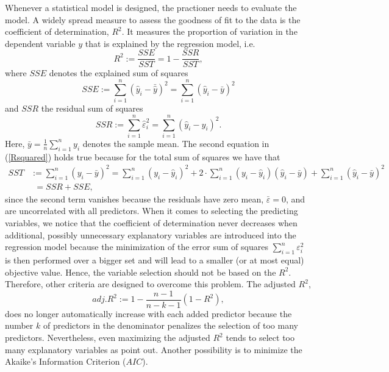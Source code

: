 \documentclass[a4paper, 11pt]{scrreprt}
\begin{document}
Whenever a statistical model is designed, the practioner needs to evaluate the model. A widely spread measure to assess the goodness of fit to the data is the coefficient of determination, $R^2$. It measures the proportion of variation in the dependent variable $y$ that is explained by the regression model, i.e.
\begin{equation}\label{Rsquared}
R^2 := \frac{SSE}{SST} = 1 - \frac{SSR}{SST},
\end{equation}
where $SSE$ denotes the explained sum of squares
\begin{equation}\label{SSE}
SSE := \sum_{i=1}^n (\hat{y}_i - \bar{\hat{y}})^2 = \sum_{i=1}^n (\hat{y}_i - \bar{y})^2
\end{equation}
and $SSR$ the residual sum of squares
\begin{equation}\label{SSR}
SSR := \sum_{i=1}^n \hat{\varepsilon}_i^2 = \sum_{i=1}^n (\hat{y}_i - y_i)^2. 
\end{equation}
Here, $\bar{y} = \frac{1}{n} \sum_{i=1}^n y_i$ denotes the sample mean.
The second equation in (\ref{Rsquared}) holds true because for the total sum of squares we have that
\begin{align} SST &:= \sum_{i=1}^n (y_i - \bar{y})^2 = \sum_{i=1}^n (y_i - \hat{y}_i)^2 + 2 \cdot \sum_{i=1}^n (y_i - \hat{y}_i)(\hat{y}_i - \bar{y}) + \sum_{i=1}^n (\hat{y}_i - \bar{y})^2 \nonumber \\
&\phantom{:}= SSR + SSE,
\end{align}
since the second term vanishes because the residuals have zero mean, $\bar{\varepsilon} = 0$, and are uncorrelated with all predictors.
When it comes to selecting the predicting variables, we notice that the coefficient of determination never decreases when additional, possibly unnecessary explanatory variables are introduced into the regression model because the minimization of the error sum of squares $\sum_{i=1}^n \varepsilon_i^2$ is then performed over a bigger set and will lead to a smaller (or at most equal) objective value.
Hence, the variable selection should not be based on the $R^2$. Therefore, other criteria are designed to overcome this problem. The adjusted $R^2$,
\begin{equation}
adj. R^2 := 1 - \frac{n-1}{n-k-1}(1-R^2), 
\end{equation}
does no longer automatically increase with each added predictor because the number $k$ of predictors in the denominator penalizes the selection of too many predictors.
Nevertheless, even maximizing the adjusted $R^2$ tends to select too many explanatory variables as \textcite[chapter 5.3]{hyndman2014forecasting} point out.
Another possibility is to minimize the Akaike's Information Criterion ($AIC$).
\end{document}
